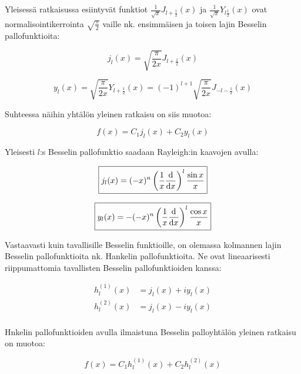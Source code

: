 \documentclass[../johdoksia.tex]{subfiles}
\begin{document}
	Yleisessä ratkaisussa esiintyvät funktiot $\frac{1}{\sqrt{x}}J_{l + \frac{1}{2}}(x)$ ja $\frac{1}{\sqrt{x}}Y_{l \frac{1}{2}}(x)$ ovat normalisointikerrointa $\sqrt{\frac{\pi}{2}}$ vaille nk. ensimmäisen ja toisen lajin Besselin pallofunktioita:
	
	\begin{equation}
		\boxed{j_l(x) = \sqrt{\frac{\pi}{2x}}J_{l + \frac{1}{2}}(x)}
	\end{equation}

	\begin{equation}
		\boxed{y_l(x) = \sqrt{\frac{\pi}{2x}}Y_{l + \frac{1}{2}}(x) = (-1)^{l + 1}\sqrt{\frac{\pi}{2x}}J_{-l-\frac{1}{2}}(x)}
	\end{equation}

	Suhteessa näihin yhtälön yleinen ratkaisu on siis muotoa:
	
	\begin{equation}
		\boxed{f(x) = C_1j_l(x) + C_2y_l(x)}
	\end{equation}

	Yleisesti $l$:s Besselin pallofunktio saadaan Rayleigh:in kaavojen avulla:
	
	\begin{equation}
		\boxed{j_l(x) = (-x)^n\left(\frac{1}{x}\odv{}{x}\right)^{l}\frac{\sin x}{x}}
	\end{equation}

	\begin{equation}
		\boxed{y_l(x) = -(-x)^n\left(\frac{1}{x}\odv{}{x}\right)^{l}\frac{\cos x}{x}}
	\end{equation}

	Vastaavasti kuin tavallisille Besselin funktioille, on olemassa kolmannen lajin Besselin pallofunktioita nk. Hankelin pallofunktioita. Ne ovat lineaarisesti riippumattomia tavallisten Besselin pallofunktioiden kanssa:
	
	\begin{equation}
		\boxed{
		\begin{aligned}
			h_l^{(1)}(x) &= j_l(x) + iy_l(x) \\
			h_l^{(2)}(x) &= j_l(x) - iy_l(x) \\
		\end{aligned}
		}
	\end{equation}

	Hnkelin pallofunktioiden avulla ilmaistuna Besselin palloyhtälön yleinen ratkaisu on muotoa:
	
	\begin{equation}
		\boxed{f(x) = C_1h_l^{(1)}(x) + C_2h_l^{(2)}(x)}
	\end{equation}
	
\end{document}
